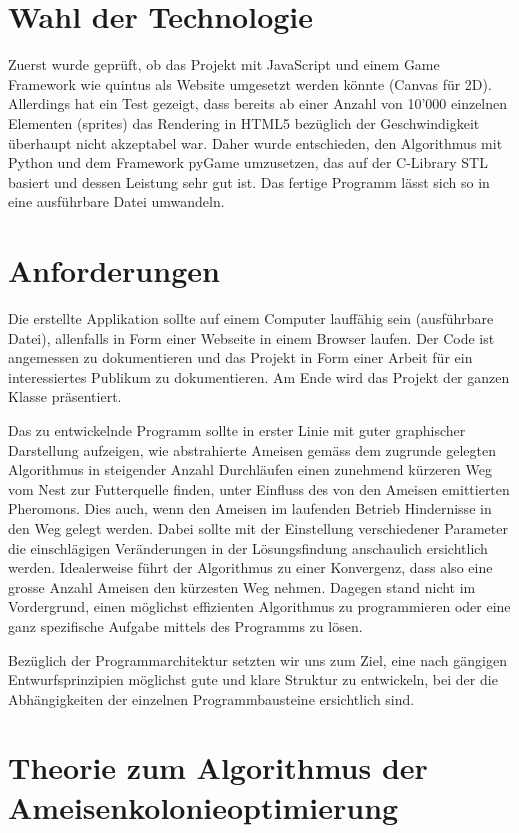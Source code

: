 \section{Wahl der Technologie}

Zuerst wurde geprüft, ob das Projekt mit JavaScript und einem Game Framework wie
quintus als Website umgesetzt werden könnte (Canvas für 2D). Allerdings hat ein
Test gezeigt, dass bereits ab einer Anzahl von 10'000 einzelnen Elementen
(sprites) das Rendering in HTML5 bezüglich der Geschwindigkeit überhaupt nicht
akzeptabel war. Daher wurde entschieden, den Algorithmus mit Python und dem
Framework pyGame umzusetzen, das auf der C-Library STL basiert und dessen
Leistung sehr gut ist. Das fertige Programm lässt sich so in eine ausführbare
Datei umwandeln.

\section{Anforderungen}

Die erstellte Applikation sollte auf einem Computer lauffähig sein (ausführbare
Datei), allenfalls in Form einer Webseite in einem Browser laufen. Der Code ist
angemessen zu dokumentieren und das Projekt in Form einer Arbeit für ein
interessiertes Publikum zu dokumentieren. Am Ende wird das Projekt der ganzen
Klasse präsentiert.

Das zu entwickelnde Programm sollte in erster Linie mit guter graphischer
Darstellung aufzeigen, wie abstrahierte Ameisen gemäss dem zugrunde gelegten
Algorithmus in steigender Anzahl Durchläufen einen zunehmend kürzeren Weg vom
Nest zur Futterquelle finden, unter Einfluss des von den Ameisen emittierten
Pheromons. Dies auch, wenn den Ameisen im laufenden Betrieb Hindernisse in den
Weg gelegt werden. Dabei sollte mit der Einstellung verschiedener Parameter die
einschlägigen Veränderungen in der Lösungsfindung anschaulich ersichtlich
werden. Idealerweise führt der Algorithmus zu einer Konvergenz, dass also eine
grosse Anzahl Ameisen den kürzesten Weg nehmen. Dagegen stand nicht im
Vordergrund, einen möglichst effizienten Algorithmus zu programmieren oder eine
ganz spezifische Aufgabe mittels des Programms zu lösen.

Bezüglich der Programmarchitektur setzten wir uns zum Ziel, eine nach gängigen
Entwurfsprinzipien möglichst gute und klare Struktur zu entwickeln, bei der die
Abhängigkeiten der einzelnen Programmbausteine ersichtlich sind.

\section{Theorie zum Algorithmus der Ameisenkolonieoptimierung}

